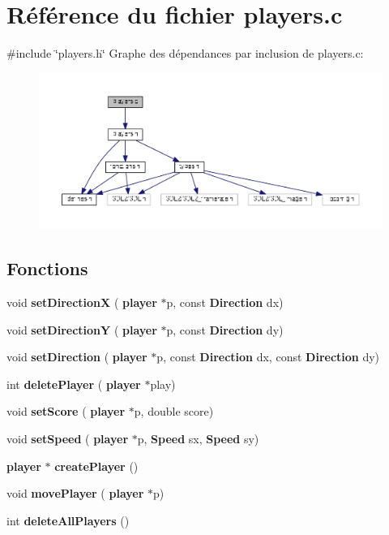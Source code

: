 \section{Référence du fichier players.\+c}
\label{players_8c}
{\ttfamily \#include \char`\"{}players.\+h\char`\"{}}\newline
Graphe des dépendances par inclusion de players.\+c\+:
\nopagebreak
\begin{figure}[H]
\begin{center}
\leavevmode
\includegraphics[width=350pt]{players_8c__incl}
\end{center}
\end{figure}
\subsection*{Fonctions}
\begin{DoxyCompactItemize}
\item 
\mbox{\label{players_8c_a171ccb671f0ad6a46718654fa0bffe10}} 
void {\bfseries set\+DirectionX} (\textbf{ player} $\ast$p, const \textbf{ Direction} dx)
\item 
\mbox{\label{players_8c_a63a649863120589ee459cf7a08902f95}} 
void {\bfseries set\+DirectionY} (\textbf{ player} $\ast$p, const \textbf{ Direction} dy)
\item 
\mbox{\label{players_8c_a84c122fe1272a6e56f76ea5597697bbe}} 
void {\bfseries set\+Direction} (\textbf{ player} $\ast$p, const \textbf{ Direction} dx, const \textbf{ Direction} dy)
\item 
\mbox{\label{players_8c_a8ceebefb9c41af5ee039bd4df9119f92}} 
int {\bfseries delete\+Player} (\textbf{ player} $\ast$play)
\item 
\mbox{\label{players_8c_abca54efb4fd2424881e91bcd7da8061a}} 
void {\bfseries set\+Score} (\textbf{ player} $\ast$p, double score)
\item 
\mbox{\label{players_8c_a252268c4afe2b752fd8b66f9c96a8df0}} 
void {\bfseries set\+Speed} (\textbf{ player} $\ast$p, \textbf{ Speed} sx, \textbf{ Speed} sy)
\item 
\textbf{ player} $\ast$ \textbf{ create\+Player} ()
\item 
\mbox{\label{players_8c_ae755369dabeb0a70730fbefb1d2d0972}} 
void {\bfseries move\+Player} (\textbf{ player} $\ast$p)
\item 
\mbox{\label{players_8c_a8bdc5cc263575cf5cf97c08e8d596293}} 
int {\bfseries delete\+All\+Players} ()
\end{DoxyCompactItemize}

